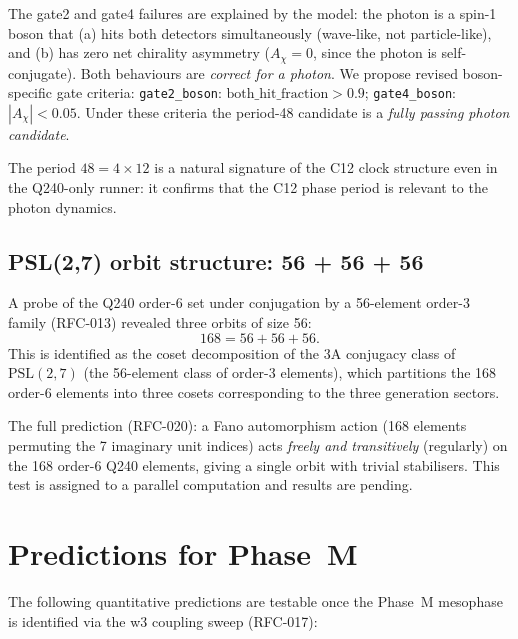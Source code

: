 \documentclass[11pt,a4paper]{article}
\theoremstyle{remark}
\begin{document}
The gate2 and gate4 failures are explained by the model: the photon is a spin-1 boson
that (a) hits both detectors simultaneously (wave-like, not particle-like), and
(b) has zero net chirality asymmetry ($A_\chi = 0$, since the photon is self-conjugate).
Both behaviours are \emph{correct for a photon}.  We propose revised boson-specific
gate criteria: \texttt{gate2\_boson}: $\mathrm{both\_hit\_fraction} > 0.9$;
\texttt{gate4\_boson}: $|A_\chi| < 0.05$.  Under these criteria the period-48 candidate
is a \emph{fully passing photon candidate}.

The period $48 = 4 \times 12$ is a natural signature of the C12 clock structure
even in the Q240-only runner: it confirms that the C12 phase period is relevant
to the photon dynamics.

\subsection{PSL(2,7) orbit structure: 56 + 56 + 56}

A probe of the Q240 order-6 set under conjugation by a 56-element order-3 family
(RFC-013) revealed three orbits of size 56:
\begin{equation}
  168 = 56 + 56 + 56 .
\end{equation}
This is identified as the coset decomposition of the 3A conjugacy class of
$\mathrm{PSL}(2,7)$ (the 56-element class of order-3 elements), which partitions
the 168 order-6 elements into three cosets corresponding to the three generation sectors.

The full prediction (RFC-020): a Fano automorphism action (168 elements permuting
the 7 imaginary unit indices) acts \emph{freely and transitively} (regularly) on the
168 order-6 Q240 elements, giving a single orbit with trivial stabilisers.
This test is assigned to a parallel computation and results are pending.

\section{Predictions for Phase~M}
\label{sec:predictions}

The following quantitative predictions are testable once the Phase~M mesophase is
identified via the w3 coupling sweep (RFC-017):
\end{document}
